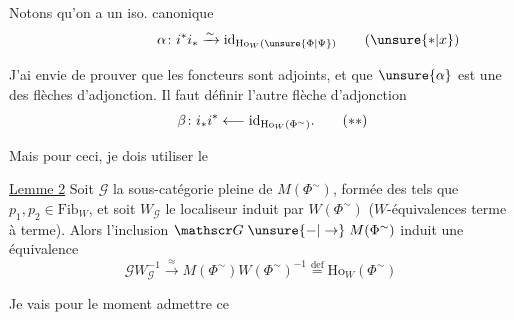 
Notons qu'on a un iso. canonique
\[
\alpha\colon i^*i_*\xrightarrow{\sim}\mathrm{id}_{\mathrm{Ho}_W(\unsure{\Phi|\Psi})}\tag*{\makebox[0pt][r]{\makebox[\displaywidth][l]{$(\unsure{*|x})$}}}
\]

J'ai envie de prouver que les foncteurs
sont adjoints, et que $\unsure{\alpha}$ est une des flèches d'adjonction. Il faut définir l'autre flèche d'adjonction
\[
\beta\colon i_*i^*\longleftarrow\mathrm{id}_{\mathrm{Ho}_W(\Phi^{\sim})}.\tag*{\makebox[0pt][r]{\makebox[\displaywidth][l]{$(**)$}}}
\]

Mais pour ceci, je dois utiliser le

\uline{Lemme 2} Soit $\mathscr G$ la sous-catégorie pleine de $M(\Phi^{\sim})$, formée des
tels que $p_1,p_2\in\mathrm{Fib}_W$, et soit $W_{\mathscr G}$ le localiseur induit par $W(\Phi^{\sim})$ ($W$-équivalences terme à terme). Alors l'inclusion $\mathscr G\mathrel{\unsure{-|\to}}M(\Phi^{\sim})$ induit une équivalence
\[
\mathscr G W_{\mathscr G}^{-1}\xrightarrow{\approx}M(\Phi^{\sim})W(\Phi^{\sim})^{-1}
\mathrel{\overset{\mathrm{def}}{=}}\mathrm{Ho}_W(\Phi^{\sim})
\]

Je vais pour le moment admettre ce
